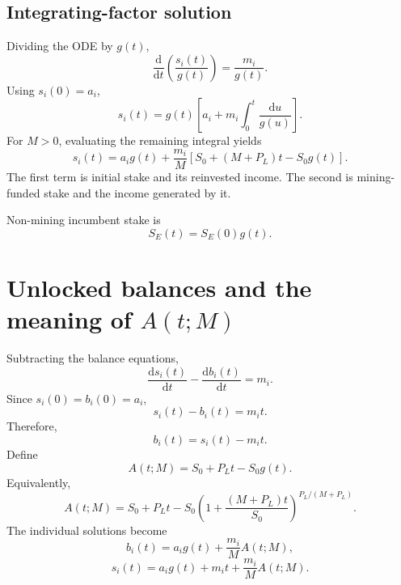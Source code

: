 \documentclass[11pt,a4paper]{article}
\newcommand{\rmd}{\mathrm{d}}
\begin{document}
\subsection{Integrating-factor solution}
Dividing the ODE by $g(t)$,
\begin{equation}
\frac{\rmd}{\rmd t}\left(\frac{s_i(t)}{g(t)}\right)=\frac{m_i}{g(t)}.
\end{equation}
Using $s_i(0)=a_i$,
\begin{equation}
s_i(t)=g(t)\left[a_i+m_i\int_0^t\frac{\rmd u}{g(u)}\right].
\end{equation}
For $M>0$, evaluating the remaining integral yields
\begin{equation}
\boxed{s_i(t)=a_i g(t)+\frac{m_i}{M}\left[S_0+(M+P_L)t-S_0g(t)\right].}
\end{equation}
The first term is initial stake and its reinvested income. The second is mining-funded stake and the income generated by it.

Non-mining incumbent stake is
\begin{equation}
\boxed{S_E(t)=S_E(0)g(t).}
\end{equation}

\section{Unlocked balances and the meaning of \texorpdfstring{$A(t;M)$}{A(t;M)}}
Subtracting the balance equations,
\begin{equation}
\frac{\rmd s_i(t)}{\rmd t}-\frac{\rmd b_i(t)}{\rmd t}=m_i.
\end{equation}
Since $s_i(0)=b_i(0)=a_i$,
\begin{equation}
s_i(t)-b_i(t)=m_it.
\end{equation}
Therefore,
\begin{equation}
b_i(t)=s_i(t)-m_it.
\end{equation}
Define
\begin{equation}
\boxed{A(t;M)=S_0+P_Lt-S_0g(t).}
\end{equation}
Equivalently,
\begin{equation}
A(t;M)=S_0+P_Lt-S_0\left(1+\frac{(M+P_L)t}{S_0}\right)^{P_L/(M+P_L)}\label{def:A}.
\end{equation}
The individual solutions become
\begin{equation}
\boxed{b_i(t)=a_i g(t)+\frac{m_i}{M}A(t;M),}
\end{equation}
\begin{equation}
\boxed{s_i(t)=a_i g(t)+m_it+\frac{m_i}{M}A(t;M).}
\end{equation}
\end{document}
